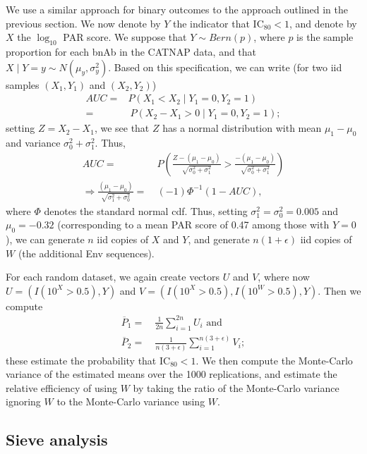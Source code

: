 \documentclass[10pt]{article}
\begin{document}
We use a similar approach for binary outcomes to the approach outlined in the previous section. We now denote by $Y$ the indicator that IC$_{80} < 1$, and denote by $X$ the $\log_{10}$ PAR score. We suppose that $Y \sim Bern(p)$, where $p$ is the sample proportion for each bnAb in the CATNAP data, and that $X \mid Y = y \sim N(\mu_y, \sigma^2_y)$. Based on this specification, we can write (for two iid samples $(X_1, Y_1)$ and $(X_2, Y_2)$)
\begin{align*}
    AUC =& P(X_1 < X_2 \mid Y_1 = 0, Y_2 = 1) \\
    =& \ P(X_2 - X_1 > 0 \mid Y_1 = 0, Y_2 = 1);
\end{align*}
setting $Z = X_2 - X_1$, we see that $Z$ has a normal distribution with mean $\mu_1 - \mu_0$ and variance $\sigma^2_0 + \sigma^2_1$. Thus,
\begin{align*}
    AUC =& \ P\left(\frac{Z - (\mu_1 - \mu_0)}{\sqrt{\sigma^2_0 + \sigma^2_1}} > \frac{- (\mu_1 - \mu_0)}{\sqrt{\sigma^2_0 + \sigma^2_1}}\right) \\
    \Rightarrow \frac{(\mu_1 - \mu_0)}{\sqrt{\sigma^2_1 + \sigma^2_0}} =& \ (-1)\Phi^{-1}(1 - AUC),
\end{align*}
where $\Phi$ denotes the standard normal cdf. Thus, setting $\sigma^2_1 = \sigma^2_0 = 0.005$ and $\mu_0 = -0.32$ (corresponding to a mean PAR score of 0.47 among those with $Y = 0$), we can generate $n$ iid copies of $X$ and $Y$, and generate $n(1 + \epsilon)$ iid copies of $W$ (the additional Env sequences).

For each random dataset, we again create vectors $U$ and $V$, where now $U = (I(10 ^ X > 0.5), Y)$ and $V = (I(10 ^ X > 0.5), I(10^W > 0.5), Y)$. Then we compute
\begin{align*}
    \overline{P}_1 =& \ \frac{1}{2n}\sum_{i=1}^{2n} U_i \text{ and } \\
    \overline{P}_2 =& \ \frac{1}{n(3+\epsilon)}\sum_{i=1}^{n(3+\epsilon)}V_i;
\end{align*}
these estimate the probability that IC$_{80} < 1$. We then compute the Monte-Carlo variance of the estimated means over the 1000 replications, and estimate the relative efficiency of using $W$ by taking the ratio of the Monte-Carlo variance ignoring $W$ to the Monte-Carlo variance using $W$.

\subsection{Sieve analysis}
\end{document}
